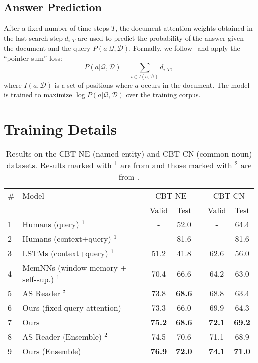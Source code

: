 \documentclass[11pt]{article}
\begin{document}
\subsection{Answer Prediction}
After a fixed number of time-steps $T$, the document attention weights obtained in the last search step $d_{i, T}$ are used to predict the probability of the answer given the document and the query $P(a | \mathcal{Q}, \mathcal{D})$. Formally, we follow~\cite{watson} and apply the ``pointer-sum'' loss:
\begin{equation}
\label{eq:answer_prob}
P(a | \mathcal{Q}, \mathcal{D}) = \sum_{i \in I(a, \mathcal{D})} d_{i, T},
\end{equation}
where $I(a, \mathcal{D})$ is a set of positions where $a$ occurs in the document. The model is trained to maximize $\log P(a | \mathcal{Q}, \mathcal{D})$ over the training corpus.

 
\section{Training Details}
\begin{table*}[t]
\small
\def\arraystretch{1.1}
\centering
\begin{tabular}{llccccc}
\toprule
\# & Model & \multicolumn{2}{c}{CBT-NE} & \phantom{ab} & \multicolumn{2}{c}{CBT-CN} \\
&& Valid & Test & & Valid & Test \\
\midrule
\small{1}&Humans (query) $^{1}$   &  - & 52.0 &  & - & 64.4 \\
\small 2&Humans (context+query) $^{1}$   & - & 81.6 &  & - & 81.6 \\
\midrule
\small3&LSTMs (context+query) $^{1}$    & 51.2  & 41.8 &  & 62.6 & 56.0 \\
\midrule
\small4&MemNNs (window memory + self-sup.) $^{1}$   & 70.4 & 66.6 &  & 64.2 & 63.0 \\
\small5&AS Reader $^{2}$                            & 73.8 & 
\textbf{68.6} &  & 68.8 & 63.4 \\
\midrule
\small6&Ours (fixed query attention) & 73.3 & 66.0 &  & 69.9 & 64.3 \\
\small7&Ours & \textbf{75.2} & \textbf{68.6} &  & \textbf{72.1} & \textbf{69.2} \\
\midrule
\midrule
\small8&AS Reader (Ensemble) $^2$ & 74.5 & 70.6 && 71.1 & 68.9 \\
\small9&Ours (Ensemble) & \textbf{76.9} & \textbf{72.0} && \textbf{74.1} & \textbf{71.0} \\
\bottomrule
\end{tabular}
\caption{\label{tab:cbt}Results on the CBT-NE (named entity) and CBT-CN (common noun) datasets. Results marked with $^1$ are from \protect\cite{hill2015goldilocks} and those marked with $^2$ are from \protect\cite{watson}.}
\end{table*}
\end{document}
